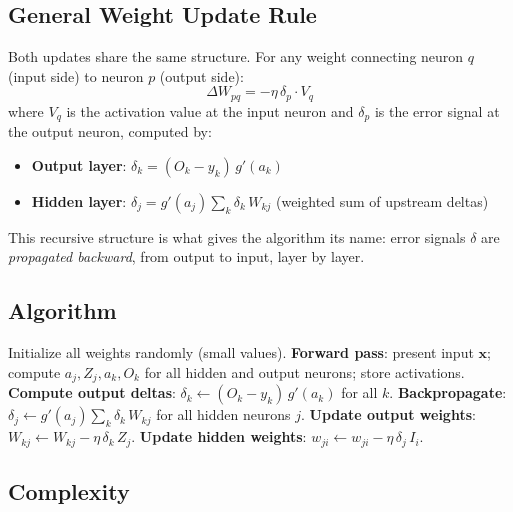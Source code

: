 \documentclass[11pt,a4paper]{article}
\theoremstyle{definition}
\theoremstyle{plain}
\theoremstyle{remark}
\begin{document}
\subsection{General Weight Update Rule}

Both updates share the same structure. For any weight connecting neuron $q$ (input side) to neuron $p$ (output side):
\[
    \Delta W_{pq} = -\eta\,\delta_p \cdot V_q
\]
where $V_q$ is the activation value at the input neuron and $\delta_p$ is the error signal at the output neuron, computed by:

\begin{itemize}
    \item \textbf{Output layer}: $\delta_k = (O_k - y_k)\,g'(a_k)$
    \item \textbf{Hidden layer}: $\delta_j = g'(a_j)\displaystyle\sum_k \delta_k\,W_{kj}$ \quad (weighted sum of upstream deltas)
\end{itemize}

This recursive structure is what gives the algorithm its name: error signals $\delta$ are \emph{propagated backward}, from output to input, layer by layer.

\subsection{Algorithm}

\begin{algorithm}
\caption{Backpropagation (online, one training example per step)}
\begin{algorithmic}[1]
\STATE Initialize all weights randomly (small values).
\REPEAT
    \STATE \textbf{Forward pass}: present input $\mathbf{x}$; compute $a_j, Z_j, a_k, O_k$ for all hidden and output neurons; store activations.
    \STATE \textbf{Compute output deltas}: $\delta_k \leftarrow (O_k - y_k)\,g'(a_k)$ for all $k$.
    \STATE \textbf{Backpropagate}: $\delta_j \leftarrow g'(a_j)\sum_k \delta_k\,W_{kj}$ for all hidden neurons $j$.
    \STATE \textbf{Update output weights}: $W_{kj} \leftarrow W_{kj} - \eta\,\delta_k\,Z_j$.
    \STATE \textbf{Update hidden weights}: $w_{ji} \leftarrow w_{ji} - \eta\,\delta_j\,I_i$.
\end{algorithmic}
\end{algorithm}

\subsection{Complexity}
\end{document}
